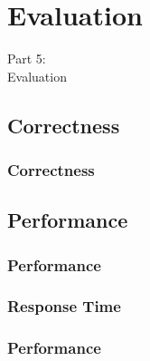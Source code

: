 \section{Evaluation}
\begin{frame}[fragile]
  \vspace{25mm}
  \begin{center}
    \Huge{Part 5:\\Evaluation}
  \end{center}
\end{frame}

\subsection{Correctness}
\begin{frame}[fragile]
  \frametitle{Correctness}
  \vspace{3mm}
  
\end{frame}

\subsection{Performance}
\begin{frame}[fragile]
  \frametitle{Performance}
  \vspace{3mm}
  
\end{frame}

\subsubsection{Response Time}
\begin{frame}[fragile]
  \frametitle{Performance }
  \vspace{3mm}
  
\end{frame}

